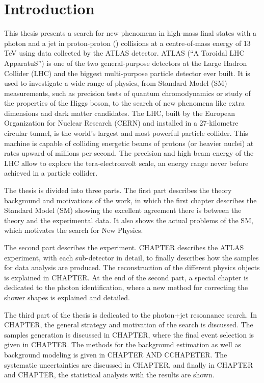 \chapter*{Introduction}

This thesis presents a search for new phenomena in high-mass final states with a photon and a jet in proton-proton (\pp) collisions at a centre-of-mass energy of 13 TeV using data collected by the \acs{ATLAS} detector. \acs{ATLAS} (“A Toroidal LHC ApparatuS”) is one of the two general-purpose detectors at the Large Hadron Collider (\acs{LHC}) and the biggest multi-purpose particle detector ever built. It is used to investigate a wide range of physics, from Standard Model (\acs{SM}) measurements, such as precision tests of quantum chromodynamics or study of the properties of the Higgs boson, to the search of new phenomena like extra dimensions and dark matter candidates. The LHC, built by the European Organization for Nuclear Research (\acs{CERN}) and installed in a 27-kilometre circular tunnel, is the world's largest and most powerful particle collider. This machine is capable of colliding energetic beams of protons (or heavier nuclei) at rates upward of millions per second. The precision and high beam energy of the LHC allow to explore the tera-electronvolt scale, an energy range never before achieved in a particle collider.



The thesis is divided into three parts. The first part describes the theory background and motivations of the work, in which the first chapter describes the Standard Model (SM) showing the excellent agreement there is between the theory and the experimental data. It also shows the actual problems of the SM, which motivates the search for New Physics.

The second part describes the experiment. CHAPTER describes the ATLAS experiment, with each sub-detector in detail, to finally describes how the samples for data analysis are produced. The reconstruction of the different physics objects is explained in CHAPTER. At the end of the second part, a special chapter is dedicated to the photon identification, where a new method for correcting the shower shapes is explained and detailed.

The third part of the thesis is dedicated to the photon+jet resoanance search.
In CHAPTER, the general strategy and motivation of the search is discussed. The samples generation is discussed in CHAPTER, where the final event selection is given in CHAPTER.
The methods for the background estimation as well as background modeling is given in CHAPTER AND CCHAPETER.
The systematic uncertainties are discussed in CHAPTER, and finally in CHAPTER and CHAPTER, the statistical analysis with the results are shown.

